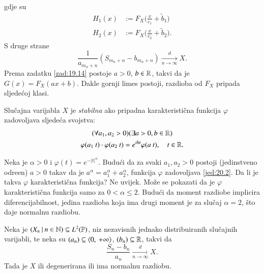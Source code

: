 gdje su
\begin{equation*}
    \begin{aligned}
        H_1 (x) &:= F_X \Big( \frac{x}{c_1} + \widetilde{b}_1 \Big)\\
        H_2 (x) &:= F_X \Big( \frac{x}{c_2} + \widetilde{b}_2 \Big).
    \end{aligned}
\end{equation*}
S druge strane
\begin{equation*}
    \frac{1}{a_{m_n + n}} (S_{m_n + n} - b_{m_n + n}) \xrightarrow[n \to \infty]{d} X.
\end{equation*}
Prema zadatku \ref{zad:19.14} postoje $a > 0$, $b \in \mathbb{R}$, takvi da je $G(x) = F_X (ax + b)$.
Dakle gornji limes postoji, razdioba od $F_X$ pripada sljede\' coj klasi.

\begin{defn}    \label{defn:20.1}
    Slu\v cajna varijabla $X$ je \emph{stabilna} ako pripadna karakteristi\v cna funkcija $\varphi$ zadovoljava sljede\' ca svojstva:
    \begin{equation}    \label{jed:20.2}
        \begin{gathered}
            (\forall a_1, a_2 > 0) (\exists a > 0, b \in \mathbb{R})\\
            \varphi (a_1 \: t) \cdot \varphi (a_2 \: t) = e^{i b t} \varphi (a \: t), \quad t \in \mathbb{R}.
        \end{gathered} 
    \end{equation}
\end{defn}

\begin{pr}  \label{pr:20.3}
    Neka je $\alpha > 0$ i $\varphi (t) = e^{-|t|^\alpha}$.
    Budu\' ci da za svaki $a_1, a_2 > 0$ postoji (jedinstveno odre\dj en) $a > 0$ takav da je $a^\alpha = a_1^\alpha + a_2^\alpha$, funkcija $\varphi$ zadovoljava \eqref{jed:20.2}.
    Da li je takva $\varphi$ karakteristi\v cna funkcija?
    Ne uvijek.
    Mo\v ze se pokazati da je $\varphi$ karakteristi\v cna funkcija samo za $0< \alpha \leq 2$.
    Budu\' ci da moment razdiobe implicira diferencijabilnost, jedina razdioba koja ima drugi moment je za slu\v caj $\alpha = 2$, \v sto daje normalnu razdiobu. 
\end{pr}

\begin{zad}[*]  \label{zad:20.4}
    Neka je $({X_n} \: | \: {n \in \mathbb{N}}) \subseteq L^2 (\mathbb{P})$, niz nezavisnih jednako distribuiranih slu\v cajnih varijabli, te neka su $(a_n) \subseteq \langle {0}, \: {+\infty} \rangle$, $(b_n) \subseteq \mathbb{R}$, takvi da
    \begin{equation*}
        \frac{S_n - b_n}{a_n} \xrightarrow[n \to \infty]{d} X.
    \end{equation*}
    Tada je $X$ ili degenerirana ili ima normalnu razdiobu.
\end{zad}

